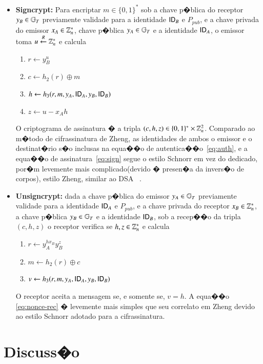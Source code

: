 \documentclass[a4paper,capchap,espacoduplo,normaltoc]{abntepusp}
\begin{document}
\begin{itemize}
\item \textbf{Signcrypt:} Para encriptar $m \in \{0, 1\}^\ast$ sob a chave p�blica do receptor $y_B \in \mathbb{G}_T$ previamente validade para a identidade $\mathsf{ID}_B$ e $P_{pub}$, e a chave privada do emissor $x_A \in \mathbb{Z}_n^\ast$, chave p�blica $y_A \in \mathbb{G}_T$ e a identidade $\mathsf{ID}_A$, o emissor toma $u \stackrel{R}{\gets} \mathbb{Z}_n^\ast$ e calcula
\begin{enumerate}
\item $r \gets y_B^u$
\item $c \gets h_2(r) \oplus m$
\item $h \gets h_3(r, m, y_A, \mathsf{ID}_A, y_B, \mathsf{ID}_B)$ \label{eq:auth}
\item $z \gets u - x_A h$ \label{eq:sign}
\end{enumerate}
O criptograma de assinatura � a tripla $(c, h, z) \in \{0, 1\}^\ast \times \mathbb{Z}_n^2$. Comparado ao m�todo de cifrassinatura de Zheng, as identidades de ambos o emissor e o destinat�rio s�o inclusas na equa��o de autentica��o~\ref{eq:auth}, e a equa��o de assinatura~\ref{eq:sign} segue o estilo Schnorr em vez do dedicado, por�m levemente mais complicado(devido � presen�a da invers�o de corpos), estilo Zheng, similar ao DSA ~\cite{nist-fips-186-2}.

\item \textbf{Unsigncrypt:} dada a chave p�blica do emissor $y_A \in \mathbb{G}_T$ previamente validade para a identidade $\mathsf{ID}_A$ e $P_{pub}$, e a chave privada do receptor $x_B \in \mathbb{Z}_n^\ast$, a chave p�blica $y_B \in \mathbb{G}_T$ e a identidade $\mathsf{ID}_B$, sob a recep��o da tripla $(c, h, z)$ o receptor verifica se $h, z \in \mathbb{Z}_n^\ast$ e calcula
\begin{enumerate}
\item $r \gets y_A^{h x_B} y_B^z$ \label{eq:nonce-rec}
\item $m \gets h_2(r) \oplus c$
\item $v \gets h_3(r, m, y_A, \mathsf{ID}_A, y_B, \mathsf{ID}_B)$
\end{enumerate}
O receptor aceita a mensagem se, e somente se, $v = h$. A equa��o \ref{eq:nonce-rec} � levemente mais simples que seu correlato em Zheng devido ao estilo Schnorr adotado para a cifrassinatura.

\end{itemize}

\chapter{Discuss�o}
\end{document}

